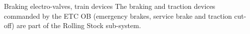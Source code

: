 \documentclass[oneside]{template/openetcs_report}
\begin{document}
Braking electro-valves, train devices The braking and traction devices commanded by the ETC OB (emergency brakes, service brake and traction cut-off) are part of the Rolling Stock sub-system.






\clearpage
\printglossary[type=\acronymtype, title=Acronyms, nonumberlist=true, style=altlong4colwithindent]
\end{document}

